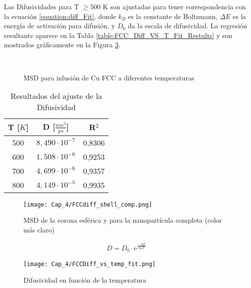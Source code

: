 Las Difusividades para T $ \geq 500$ K son ajustadas para tener correspondencia con la ecuación \ref{equation:diff_Fit}, donde $k_{B}$ es la constante de Boltzmann, $\Delta E$ es la energía de activación para difusión, y $D_{0}$ da la escala de difusividad. La regresión resultante aparece en la Tabla \ref{table:FCC_Diff_VS_T_Fit_Restults} y son mostrados gráficamente en la Figura \ref{figure:FCC_diff_vs_T}.

\begin{figure}[htp]
\centering
{}
\\
\caption{MSD para inlusión de Cu FCC a diferentes temperaturas}
\label{figure:msd_Cu}
\end{figure}

\begin{table}[htp]
\caption{Resultados del ajuste de la Difusividad}
\begin{center}
\begin{tabular}{*{3}{c}}
\hline
T [$K$] & D [$\frac{nm^{2}}{ps}$] & R$^{2}$ \\
\hline
500 & $8,490\cdot 10^{-7}$ & 0,8306 \\
\hline
600 & $1,508\cdot 10^{-6}$ & 0,9253 \\
\hline
700 & $4,699\cdot 10^{-6}$ & 0,9357 \\
\hline
800 & $4,149\cdot 10^{-5}$ & 0,9935 \\
\hline
\end{tabular}
\end{center}
\label{table:FCC_Diff_Fit_Restults}
\end{table}

\begin{figure}[htp]
\centering
\texttt{[image: Cap\_4/FCCdiff\_shell\_comp.png]}
\caption{MSD de la corona esférica y para la nanopartícula completa (color más claro)}
\label{figure:FCCdiff_shell_comp}
\end{figure}

\begin{eqnarray}
D = D_{0}\cdot \mathrm{e}^{\frac{-\Delta E}{k_{B} T}}
\label{equation:diff_Fit}
\end{eqnarray}

\begin{figure}[htp]
\centering
\texttt{[image: Cap\_4/FCCDiff\_vs\_temp\_fit.png]}
\caption{Difusividad en función de la temperatura}
\label{figure:FCC_diff_vs_T}
\end{figure}

